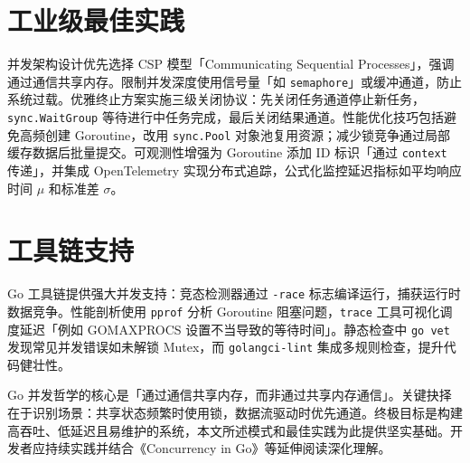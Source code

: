 \chapter{工业级最佳实践}
并发架构设计优先选择 CSP 模型「Communicating Sequential Processes」，强调通过通信共享内存。限制并发深度使用信号量「如 \texttt{semaphore}」或缓冲通道，防止系统过载。优雅终止方案实施三级关闭协议：先关闭任务通道停止新任务，\texttt{sync.WaitGroup} 等待进行中任务完成，最后关闭结果通道。性能优化技巧包括避免高频创建 Goroutine，改用 \texttt{sync.Pool} 对象池复用资源；减少锁竞争通过局部缓存数据后批量提交。可观测性增强为 Goroutine 添加 ID 标识「通过 \texttt{context} 传递」，并集成 OpenTelemetry 实现分布式追踪，公式化监控延迟指标如平均响应时间 $\mu$ 和标准差 $\sigma$。\par
\chapter{工具链支持}
Go 工具链提供强大并发支持：竞态检测器通过 \texttt{-race} 标志编译运行，捕获运行时数据竞争。性能剖析使用 \texttt{pprof} 分析 Goroutine 阻塞问题，\texttt{trace} 工具可视化调度延迟「例如 GOMAXPROCS 设置不当导致的等待时间」。静态检查中 \texttt{go vet} 发现常见并发错误如未解锁 Mutex，而 \texttt{golangci-lint} 集成多规则检查，提升代码健壮性。\par
Go 并发哲学的核心是「通过通信共享内存，而非通过共享内存通信」。关键抉择在于识别场景：共享状态频繁时使用锁，数据流驱动时优先通道。终极目标是构建高吞吐、低延迟且易维护的系统，本文所述模式和最佳实践为此提供坚实基础。开发者应持续实践并结合《Concurrency in Go》等延伸阅读深化理解。\par
